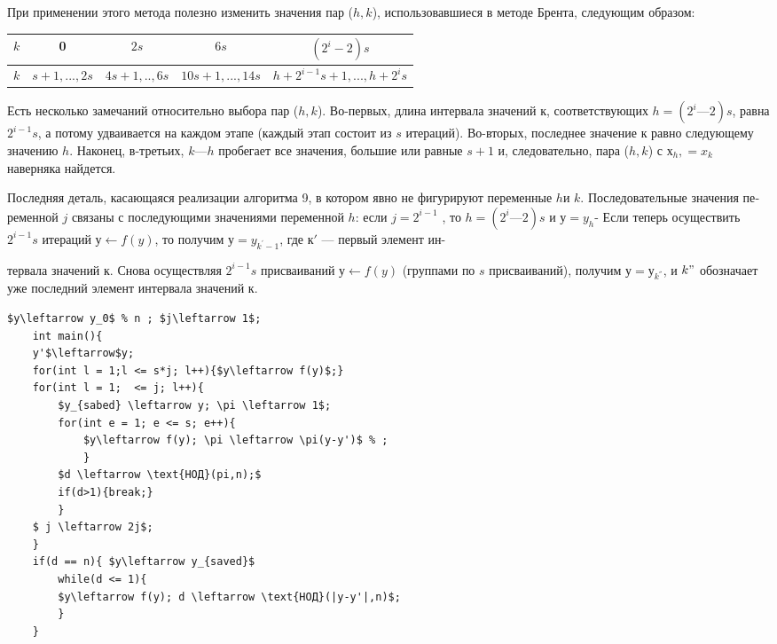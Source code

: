 \documentclass{mai_book}
\begin{document}
	При применении этого метода полезно изменить значения пар ($h, k$),	использовавшиеся в методе Брента, следующим образом:	
	
	\begin{table}[h!]
		\centering
		\label{my-label}
		\begin{tabular}{|c|c|c|c|c|}
			$k$ & 0            & $2s$             & $6s$                & $(2^i-2)s$                         \\ \hline
			$k$ & $s+1,...,2s$ & $4s + 1,.. , 6s$ & $10s + 1 ,..., 14s$ & $h + 2^{ i-1}s + 1 ,..., h + 2^is$
		\end{tabular}
	\end{table}

	Есть несколько замечаний относительно выбора пар ($h, k$). Во-первых, длина интервала значений $к$, соответствующих $h = (2^i — 2)s$, равна	$2^{i-1}s$, а потому удваивается на каждом этапе (каждый этап состоит	из $s$ итераций). Во-вторых, последнее значение $к$ равно следующему	значению $h$. Наконец, в-третьих, $k — h$ пробегает все значения, большие  или равные $s + 1$ и, следовательно, пара ($h,k$) с $х_h, = x_k$ наверняка	найдется.
	
	Последняя деталь, касающаяся реализации алгоритма 9, в котором	явно не фигурируют переменные $h$и $k$. Последовательные значения пе­ременной $j$ связаны с последующими значениями переменной $h$: если	$j = 2^{i-1}$ , то $h = (2^i — 2)s$ и $у = y_h$- Если теперь осуществить $2^{i-1}s$ итераций $у \leftarrow f(y)$, то получим $у = y_{k^{'}-1}$, где $к'$ — первый элемент ин-
	
	\pagebreak
	\noindent
	тервала значений $к$. Снова осуществляя $2^{i-1}s$ присваиваний $у \leftarrow f(y)$ (группами по $s$ присваиваний), получим $у = у_{k^{''}}$, и $k"$ обозначает уже	последний элемент интервала значений $к$.

	
	\begin{lstlisting}[mathescape=true,caption=Оптимизированный $\rho$-метод Полларда]
	$y\leftarrow y_0$ % n ; $j\leftarrow 1$;
	int main(){
	y'$\leftarrow$y;
	for(int l = 1;l <= s*j; l++){$y\leftarrow f(y)$;}
	for(int l = 1;  <= j; l++){
		$y_{sabed} \leftarrow y; \pi \leftarrow 1$;
		for(int e = 1; e <= s; e++){
			$y\leftarrow f(y); \pi \leftarrow \pi(y-y')$ % ;		
			}
		$d \leftarrow \text{НОД}(pi,n);$
		if(d>1){break;}		
		}
	$ j \leftarrow 2j$;	
	}
	if(d == n){ $y\leftarrow y_{saved}$
		while(d <= 1){
		$y\leftarrow f(y); d \leftarrow \text{НОД}(|y-y'|,n)$;
		}
	}
	
	\end{lstlisting}
	
\end{document}
